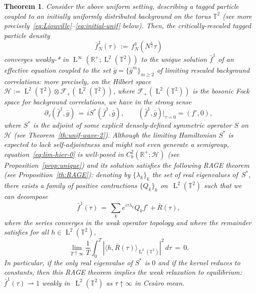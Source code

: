 \documentclass[a4paper,11pt,reqno,noindent]{amsart}
\theoremstyle{plain}
\newtheorem{theor}[lem]{Theorem}
\numberwithin{equation}{section}
\newcommand{\R}{\mathbb R}
\newcommand{\T}{\mathbb T}
\newcommand{\Hc}{\mathcal H}
\newcommand{\3}{|\!|\!|}
\newcommand{\Ld}{\operatorname{L}}
\newcommand{\cvf}{\rightharpoonup}
\begin{document}
\begin{theor}\label{th:main-unif}
Consider the above uniform setting, describing a tagged particle coupled to an initially uniformly distributed background on the torus $\T^2$ (see more precisely~\eqref{eq:Liouville}--\eqref{eq:initial-unif} below).
Then, the critically-rescaled tagged particle density
\[\bar f^1_N(\tau)\,:=\,f_N^1(N^\frac12\tau)\]
converges weakly-* in $\Ld^\infty(\R^+;\Ld^2(\T^2))$ to the unique solution $\bar f^1$ of an effective equation coupled to the set $\bar g=\{\bar g^m\}_{m\ge2}$ of limiting rescaled background correlations: more precisely, on the Hilbert space $\Hc:=\Ld^2(\T^2)\otimes\mathcal F_+(\Ld^2(\T^2))$, where $\mathcal F_+(\Ld^2(\T^2))$ is the bosonic Fock space for background correlations,
we have in the strong sense
\begin{equation}\label{eq:lim-hier-0}
\partial_\tau({\bar f^1},{\bar g})\,=\,iS^*({\bar f^1},{\bar g}),\qquad ({\bar f^1},{\bar g})|_{\tau=0}=({f^\circ},0),
\end{equation}
where $S^*$ is the adjoint of some explicit densely-defined symmetric operator $S$ on $\Hc$ (see Theorem~\ref{th:unif-wave-2}).
Although the limiting Hamiltonian $S^*$ is expected to lack self-adjointness and might not even generate a semigroup, equation~\eqref{eq:lim-hier-0} is well-posed in $C^2_b(\R^+;\Hc)$ (see Proposition~\ref{prop:unique}) and its solution satisfies the following RAGE theorem (see Proposition~\ref{th:RAGE}): denoting by $\{\lambda_k\}_k$ the set of real eigenvalues of~$S^*$, there exists a family of positive contractions $\{Q_k\}_k$ on~$\Ld^2(\T^2)$ such that we can decompose
\[\bar f^1(\tau)\,=\,\sum_ke^{i\tau\lambda_k}Q_kf^\circ+\bar R(\tau),\]
where the series converges in the weak operator topology and where the remainder satisfies for all $h\in\Ld^2(\T^2)$,
\[\lim_{T\uparrow\infty}\frac1T\int_0^T|\langle h,\bar R(\tau)\rangle_{\Ld^2(\T^2)}|^2\,d\tau\,=\,0.\]
{In particular, if the only real eigenvalue of $S^*$ is $0$ and if the kernel reduces to constants, then this RAGE theorem implies the weak relaxation to equilibrium: $\bar f^1(\tau)\cvf1$ weakly in~$\Ld^2(\T^2)$ as $\tau\uparrow\infty$ in Ces\`aro mean.}
\end{theor}
\end{document}

